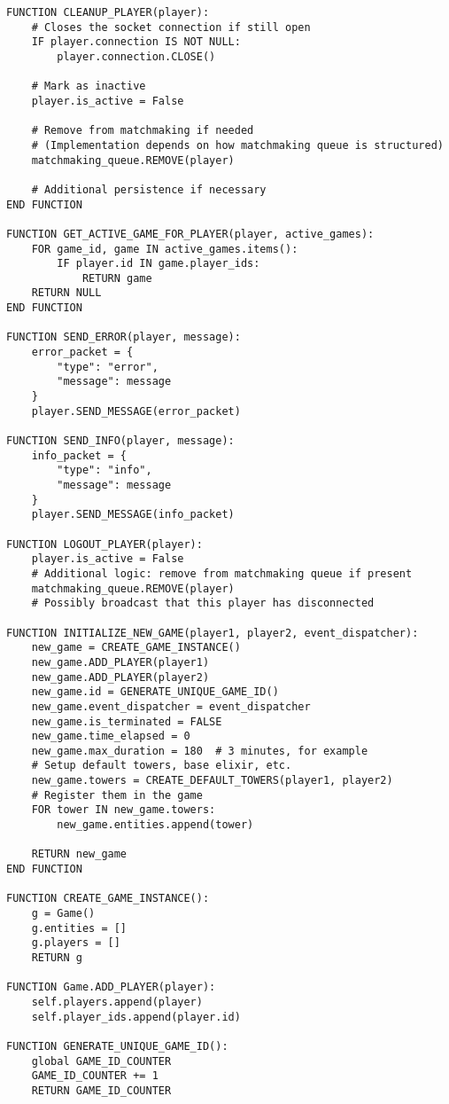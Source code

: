 \documentclass{article}
\begin{document}
\begin{lstlisting}[style=pseudo]
FUNCTION CLEANUP_PLAYER(player):
    # Closes the socket connection if still open
    IF player.connection IS NOT NULL:
        player.connection.CLOSE()

    # Mark as inactive
    player.is_active = False

    # Remove from matchmaking if needed
    # (Implementation depends on how matchmaking queue is structured)
    matchmaking_queue.REMOVE(player)

    # Additional persistence if necessary
END FUNCTION

FUNCTION GET_ACTIVE_GAME_FOR_PLAYER(player, active_games):
    FOR game_id, game IN active_games.items():
        IF player.id IN game.player_ids:
            RETURN game
    RETURN NULL
END FUNCTION

FUNCTION SEND_ERROR(player, message):
    error_packet = {
        "type": "error",
        "message": message
    }
    player.SEND_MESSAGE(error_packet)

FUNCTION SEND_INFO(player, message):
    info_packet = {
        "type": "info",
        "message": message
    }
    player.SEND_MESSAGE(info_packet)

FUNCTION LOGOUT_PLAYER(player):
    player.is_active = False
    # Additional logic: remove from matchmaking queue if present
    matchmaking_queue.REMOVE(player)
    # Possibly broadcast that this player has disconnected

FUNCTION INITIALIZE_NEW_GAME(player1, player2, event_dispatcher):
    new_game = CREATE_GAME_INSTANCE()
    new_game.ADD_PLAYER(player1)
    new_game.ADD_PLAYER(player2)
    new_game.id = GENERATE_UNIQUE_GAME_ID()
    new_game.event_dispatcher = event_dispatcher
    new_game.is_terminated = FALSE
    new_game.time_elapsed = 0
    new_game.max_duration = 180  # 3 minutes, for example
    # Setup default towers, base elixir, etc.
    new_game.towers = CREATE_DEFAULT_TOWERS(player1, player2)
    # Register them in the game
    FOR tower IN new_game.towers:
        new_game.entities.append(tower)

    RETURN new_game
END FUNCTION

FUNCTION CREATE_GAME_INSTANCE():
    g = Game()
    g.entities = []
    g.players = []
    RETURN g

FUNCTION Game.ADD_PLAYER(player):
    self.players.append(player)
    self.player_ids.append(player.id)

FUNCTION GENERATE_UNIQUE_GAME_ID():
    global GAME_ID_COUNTER
    GAME_ID_COUNTER += 1
    RETURN GAME_ID_COUNTER


\end{lstlisting}
\end{document}
